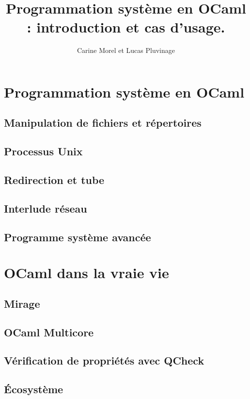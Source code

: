 \documentclass[xcolor=x11names]{beamer}
\title[Programmation système en OCaml]{Programmation système en OCaml : introduction et cas d'usage.}
\author[Carine et Lucas]{Carine Morel et Lucas Pluvinage}
\institute{Tarides}
\begin{document}
\maketitle


\section{Programmation système en OCaml}


\subsection{Manipulation de fichiers et répertoires}



\subsection{Processus Unix }


\subsection{Redirection et tube}


\subsection{Interlude réseau}


\subsection{Programme système avancée}


\section{OCaml dans la vraie vie}

\subsection{Mirage}

\subsection{OCaml Multicore}

\subsection{Vérification de propriétés avec QCheck}

\subsection{Écosystème}

\end{document}
